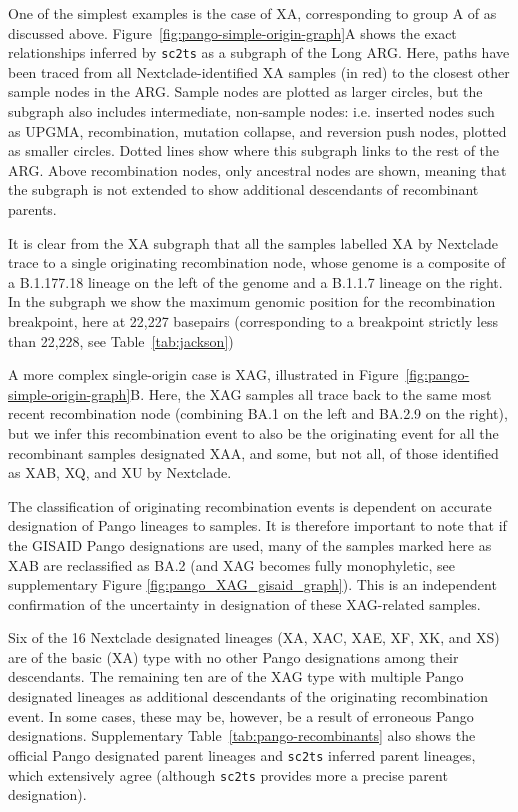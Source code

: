 \documentclass{article}
\begin{document}
One of the simplest examples is the case of XA, corresponding to group A
of \citet{Jackson2021-ik} as discussed above. Figure~\ref{fig:pango-simple-origin-graph}A
shows the exact relationships inferred by \texttt{sc2ts} as a subgraph of the Long ARG.
Here, paths have been traced from all
Nextclade-identified XA samples (in red) to the closest other sample nodes in the ARG.
Sample nodes are plotted as larger circles, but the subgraph also includes intermediate,
non-sample nodes: i.e. inserted nodes such as UPGMA, recombination, mutation collapse, and
reversion push nodes, plotted as smaller circles. Dotted lines show where this subgraph links
to the rest of the ARG. Above recombination nodes, only ancestral nodes are shown, meaning
that the subgraph is not extended to show additional descendants of recombinant parents.

It is clear from the XA subgraph that all the samples labelled XA by Nextclade trace to a
single originating recombination node, whose genome is a composite of a B.1.177.18 lineage
on the left of the genome and a B.1.1.7 lineage on the right. In the subgraph we show
the maximum genomic position for the recombination breakpoint, here at 22,227 basepairs
(corresponding to a breakpoint strictly less than 22,228, see Table~\ref{tab:jackson})


A more complex single-origin case is XAG, illustrated in
Figure~\ref{fig:pango-simple-origin-graph}B. Here, the XAG samples
all trace back to the same most recent recombination node
(combining BA.1 on the left and BA.2.9 on the right), but
we infer this recombination event to also be the originating event for
all the recombinant samples designated XAA,
and some, but not all, of those identified as XAB, XQ, and XU by Nextclade.

The classification of originating recombination events is dependent on
accurate designation of Pango lineages to samples. It is therefore important
to note that if the GISAID Pango designations are used, many of the samples
marked here as XAB are reclassified as BA.2 (and XAG becomes fully monophyletic,
see supplementary Figure \ref{fig:pango_XAG_gisaid_graph}). This is an
independent confirmation of the uncertainty in designation of these XAG-related
samples.

Six of the 16 Nextclade designated lineages (XA, XAC, XAE, XF, XK, and XS) are of the
basic (XA) type with no other Pango designations among their descendants.
The remaining ten are of the XAG type with multiple Pango
designated lineages as additional descendants of the originating recombination event.
In some cases,
these may be, however, be a result of erroneous Pango designations.
Supplementary Table~\ref{tab:pango-recombinants} also shows the official
Pango designated parent lineages and \texttt{sc2ts} inferred parent lineages,
which extensively agree (although \texttt{sc2ts} provides more a precise
parent designation).
\end{document}
